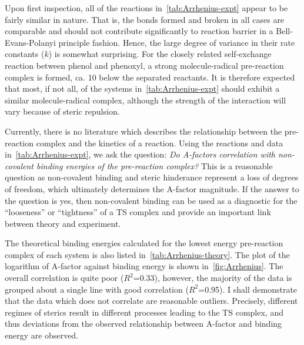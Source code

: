 Upon first inspection, all of the reactions in~\ref{tab:Arrhenius-expt} appear to be fairly similar in nature. That is, the bonds formed and broken in all cases are comparable and should not contribute significantly to reaction barrier in a Bell-Evans-Polanyi principle fashion. Hence, the large degree of variance in their rate constants ($k$) is somewhat surprising. For the closely related self-exchange reaction between phenol and phenoxyl,\cite{Mayer2002} a strong molecule-radical pre-reaction complex is formed, ca. 10 \kcalmol below the separated reactants. It is therefore expected that most, if not all, of the systems in~\ref{tab:Arrhenius-expt} should exhibit a similar molecule-radical complex, although the strength of the interaction will vary because of steric repulsion.

Currently, there is no literature which describes the relationship between the pre-reaction complex and the kinetics of a reaction. Using the reactions and data in~\ref{tab:Arrhenius-expt}, we ask the question: \emph{Do A-factors correlation with non-covalent binding energies of the pre-reaction complex?} This is a reasonable question as non-covalent binding and steric hinderance represent a loss of degrees of freedom, which ultimately determines the A-factor magnitude. If the answer to the question is yes, then non-covalent binding can be used as a diagnostic for the ``looseness'' or ``tightness'' of a TS complex and provide an important link between theory and experiment.

The theoretical binding energies calculated for the lowest energy pre-reaction complex of each system is also listed in~\ref{tab:Arrhenius-theory}. The plot of the logarithm of A-factor against binding energy is shown in~\ref{fig:Arrhenius}. The overall correlation is quite poor ($R^2$=0.33), however, the majority of the data is grouped about a single line with good correlation ($R^2$=0.95). I shall demonstrate that the data which does not correlate are reasonable outliers. Precisely, different regimes of sterics result in different processes leading to the TS complex, and thus deviations from the observed relationship between A-factor and binding energy are observed.

% 

